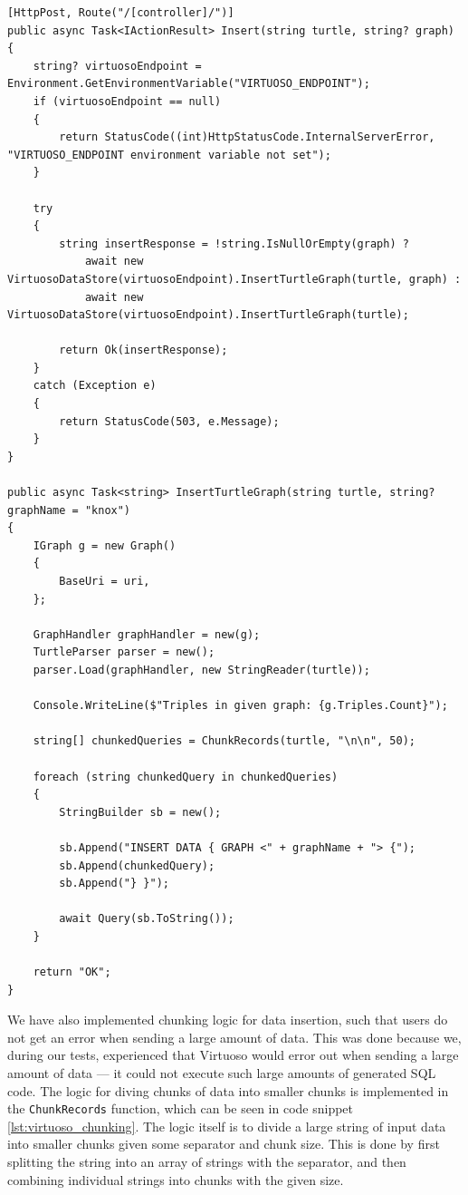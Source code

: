 \begin{lstlisting}[language=CSharp, caption={Data insertion endpoint and data insertion logic}, label={lst:virtuoso_data_insertion}]
[HttpPost, Route("/[controller]/")]
public async Task<IActionResult> Insert(string turtle, string? graph)
{
    string? virtuosoEndpoint = Environment.GetEnvironmentVariable("VIRTUOSO_ENDPOINT");
    if (virtuosoEndpoint == null)
    {
        return StatusCode((int)HttpStatusCode.InternalServerError, "VIRTUOSO_ENDPOINT environment variable not set");
    }

    try
    {
        string insertResponse = !string.IsNullOrEmpty(graph) ?
            await new VirtuosoDataStore(virtuosoEndpoint).InsertTurtleGraph(turtle, graph) :
            await new VirtuosoDataStore(virtuosoEndpoint).InsertTurtleGraph(turtle);

        return Ok(insertResponse);
    }
    catch (Exception e)
    {
        return StatusCode(503, e.Message);
    }
}

public async Task<string> InsertTurtleGraph(string turtle, string? graphName = "knox")
{
    IGraph g = new Graph()
    {
        BaseUri = uri,
    };
    
    GraphHandler graphHandler = new(g);
    TurtleParser parser = new();
    parser.Load(graphHandler, new StringReader(turtle));
    
    Console.WriteLine($"Triples in given graph: {g.Triples.Count}");

    string[] chunkedQueries = ChunkRecords(turtle, "\n\n", 50);

    foreach (string chunkedQuery in chunkedQueries)
    {
        StringBuilder sb = new();
        
        sb.Append("INSERT DATA { GRAPH <" + graphName + "> {");
        sb.Append(chunkedQuery);
        sb.Append("} }");

        await Query(sb.ToString());
    }

    return "OK";
}
\end{lstlisting}


We have also implemented chunking logic for data insertion, such that users do not get an error when sending a large amount of data. This was done because we, during our tests, experienced that Virtuoso would error out when sending a large amount of data --- it could not execute such large amounts of generated SQL code. The logic for diving chunks of data into smaller chunks is implemented in the \texttt{ChunkRecords} function, which can be seen in code snippet \ref{lst:virtuoso_chunking}. The logic itself is to divide a large string of input data into smaller chunks given some separator and chunk size. This is done by first splitting the string into an array of strings with the separator, and then combining individual strings into chunks with the given size.

